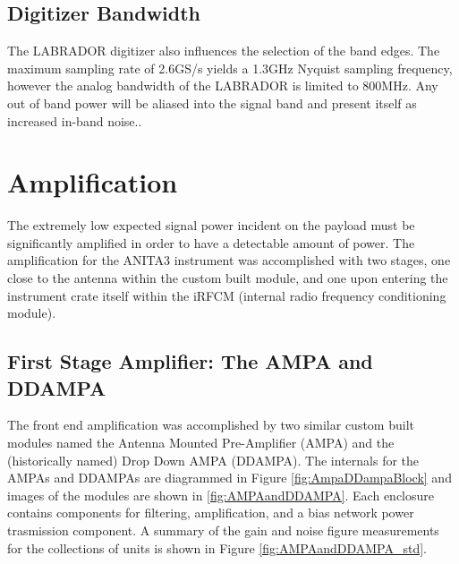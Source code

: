 	\subsection{Digitizer Bandwidth}
		The LABRADOR digitizer also influences the selection of the band edges.  The maximum sampling rate of 2.6GS/s yields a 1.3GHz Nyquist sampling frequency, however the analog bandwidth of the LABRADOR is limited to 800MHz.\cite{LABASICPAPER}  Any out of band power will be aliased into the signal band and present itself as increased in-band noise.\cite{NyquistSampling}. 
		
\section{Amplification}
	The extremely low expected signal power incident on the payload must be significantly amplified in order to have a detectable amount of power.  The amplification for the ANITA3 instrument was accomplished with two stages, one close to the antenna within the custom built module, and one upon entering the instrument crate itself within the iRFCM (internal radio frequency conditioning module).  
	
	\subsection{First Stage Amplifier: The AMPA and DDAMPA}
		The front end amplification was accomplished by two similar custom built modules named the Antenna Mounted Pre-Amplifier (AMPA) and the (historically named) Drop Down AMPA (DDAMPA).  The internals for the AMPAs and DDAMPAs are diagrammed in Figure \ref{fig:AmpaDDampaBlock} and images of the modules are shown in \ref{fig:AMPAandDDAMPA}. Each enclosure contains components for filtering, amplification, and a bias network power trasmission component.  A summary of the gain and noise figure measurements for the collections of units is shown in Figure \ref{fig:AMPAandDDAMPA_std}.
		
